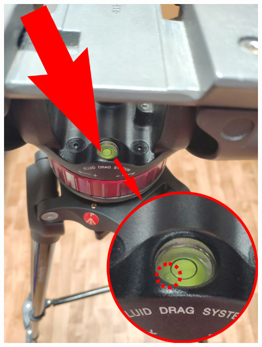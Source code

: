 \begin{enumerate}
\begin{enumerate}
                \begin{minipage}[c]{0.29\textwidth}
                  \centering
                  \includegraphics[width=\textwidth]{Images/PortableCamera/tripod/step2.4-1-bubble-before.jpg}
                \end{minipage}
                \hfill
                \begin{minipage}[c]{0.29\textwidth}
                  \centering

\end{minipage}
\end{enumerate}
\end{enumerate}

